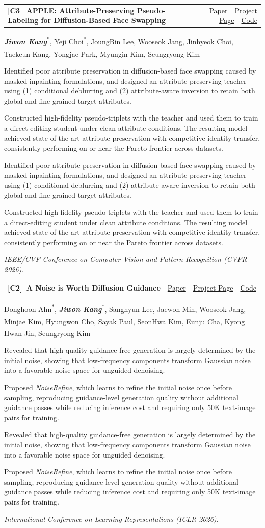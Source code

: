\documentclass[11pt,letterpaper]{article}
\makeatletter
\newcommand{\me}[1]{\textbf{\textit{\uline{#1}}}}   %
\newcommand{\eqc}{\textsuperscript{*}}              %
\newcommand{\corr}{\textsuperscript{\dag}}          %
\newcommand{\publinks}[3]{%
  \small\color{linkblue}%
  \href{#1}{Paper}~\textbar~\href{#2}{Project Page}~\textbar~\href{#3}{Code}%
}
\newcommand{\pubitem}[6]{%
  \begingroup
  \setlength{\parfillskip}{0pt}%
  \noindent\begin{minipage}{\linewidth}%
  \setlength{\tabcolsep}{0pt}%
  \noindent
  \begin{tabularx}{\linewidth}{@{}>{\RaggedRight\arraybackslash}X @{\hspace{1.5em}} r@{}}
    \textbf{#1\ #2} & #3
  \end{tabularx}\par
  #4\par
  \def\pub@desc{#6}%
  \ifx\pub@desc\@empty\else
    \begin{cvbullets}#6\end{cvbullets}%
  \fi
  \textit{#5}\par
  \end{minipage}%
  \par
  \endgroup
}
\makeatother
\begin{document}
\pubitem{[C3]}
  {\label{APPLE}APPLE: Attribute-Preserving Pseudo-Labeling for Diffusion-Based Face Swapping}
  {\publinks{https://arxiv.org/abs/2601.15288}{https://cvlab-kaist.github.io/APPLE/}{https://github.com/cvlab-kaist/APPLE}}
  {\me{Jiwon Kang}\eqc, Yeji Choi\eqc, JoungBin Lee, Wooseok Jang, Jinhyeok Choi, Taekeun Kang, Yongjae Park, Myungin Kim, Seungryong Kim\corr}
  {IEEE/CVF Conference on Computer Vision and Pattern Recognition (CVPR 2026).}
  {\item Identified poor attribute preservation in diffusion-based face swapping caused by masked inpainting formulations, and designed an attribute-preserving teacher using (1) conditional deblurring and (2) attribute-aware inversion to retain both global and fine-grained target attributes.
  \item Constructed high-fidelity pseudo-triplets with the teacher and used them to train a direct-editing student under clean attribute conditions. The resulting model achieved state-of-the-art attribute preservation with competitive identity transfer, consistently performing on or near the Pareto frontier across datasets.}

\pubitem{[C2]}
  {\label{NoiseRefine}A Noise is Worth Diffusion Guidance}
  {\publinks{https://arxiv.org/abs/2412.03895}{https://cvlab-kaist.github.io/NoiseRefine/}{https://github.com/cvlab-kaist/NoiseRefine}}
  {Donghoon Ahn\eqc, \me{Jiwon Kang}\eqc, Sanghyun Lee, Jaewon Min, Wooseok Jang, Minjae Kim, Hyungwon Cho, Sayak Paul, SeonHwa Kim, Eunju Cha\corr, Kyong Hwan Jin\corr, Seungryong Kim\corr}
  {International Conference on Learning Representations (ICLR 2026).}
  {\item Revealed that high-quality guidance-free generation is largely determined by the initial noise, showing that low-frequency components transform Gaussian noise into a favorable noise space for unguided denoising. \item Proposed \textit{NoiseRefine}, which learns to refine the initial noise once before sampling, reproducing guidance-level generation quality without additional guidance passes while reducing inference cost and requiring only 50K text-image pairs for training.}
\end{document}
